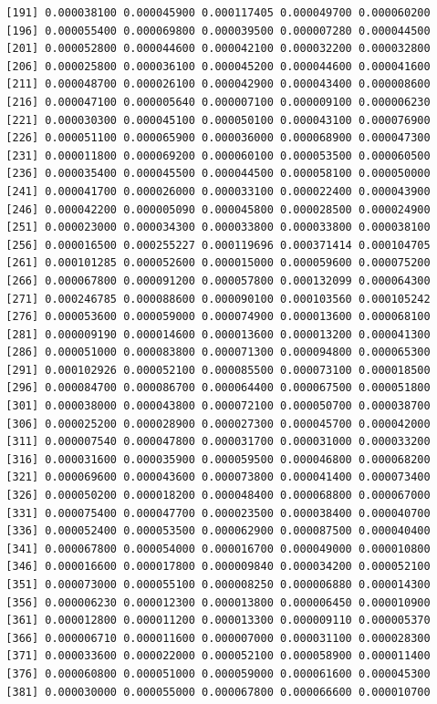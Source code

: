 \documentclass[]{article}
\begin{document}
\begin{verbatim}
  [191] 0.000038100 0.000045900 0.000117405 0.000049700 0.000060200
  [196] 0.000055400 0.000069800 0.000039500 0.000007280 0.000044500
  [201] 0.000052800 0.000044600 0.000042100 0.000032200 0.000032800
  [206] 0.000025800 0.000036100 0.000045200 0.000044600 0.000041600
  [211] 0.000048700 0.000026100 0.000042900 0.000043400 0.000008600
  [216] 0.000047100 0.000005640 0.000007100 0.000009100 0.000006230
  [221] 0.000030300 0.000045100 0.000050100 0.000043100 0.000076900
  [226] 0.000051100 0.000065900 0.000036000 0.000068900 0.000047300
  [231] 0.000011800 0.000069200 0.000060100 0.000053500 0.000060500
  [236] 0.000035400 0.000045500 0.000044500 0.000058100 0.000050000
  [241] 0.000041700 0.000026000 0.000033100 0.000022400 0.000043900
  [246] 0.000042200 0.000005090 0.000045800 0.000028500 0.000024900
  [251] 0.000023000 0.000034300 0.000033800 0.000033800 0.000038100
  [256] 0.000016500 0.000255227 0.000119696 0.000371414 0.000104705
  [261] 0.000101285 0.000052600 0.000015000 0.000059600 0.000075200
  [266] 0.000067800 0.000091200 0.000057800 0.000132099 0.000064300
  [271] 0.000246785 0.000088600 0.000090100 0.000103560 0.000105242
  [276] 0.000053600 0.000059000 0.000074900 0.000013600 0.000068100
  [281] 0.000009190 0.000014600 0.000013600 0.000013200 0.000041300
  [286] 0.000051000 0.000083800 0.000071300 0.000094800 0.000065300
  [291] 0.000102926 0.000052100 0.000085500 0.000073100 0.000018500
  [296] 0.000084700 0.000086700 0.000064400 0.000067500 0.000051800
  [301] 0.000038000 0.000043800 0.000072100 0.000050700 0.000038700
  [306] 0.000025200 0.000028900 0.000027300 0.000045700 0.000042000
  [311] 0.000007540 0.000047800 0.000031700 0.000031000 0.000033200
  [316] 0.000031600 0.000035900 0.000059500 0.000046800 0.000068200
  [321] 0.000069600 0.000043600 0.000073800 0.000041400 0.000073400
  [326] 0.000050200 0.000018200 0.000048400 0.000068800 0.000067000
  [331] 0.000075400 0.000047700 0.000023500 0.000038400 0.000040700
  [336] 0.000052400 0.000053500 0.000062900 0.000087500 0.000040400
  [341] 0.000067800 0.000054000 0.000016700 0.000049000 0.000010800
  [346] 0.000016600 0.000017800 0.000009840 0.000034200 0.000052100
  [351] 0.000073000 0.000055100 0.000008250 0.000006880 0.000014300
  [356] 0.000006230 0.000012300 0.000013800 0.000006450 0.000010900
  [361] 0.000012800 0.000011200 0.000013300 0.000009110 0.000005370
  [366] 0.000006710 0.000011600 0.000007000 0.000031100 0.000028300
  [371] 0.000033600 0.000022000 0.000052100 0.000058900 0.000011400
  [376] 0.000060800 0.000051000 0.000059000 0.000061600 0.000045300
  [381] 0.000030000 0.000055000 0.000067800 0.000066600 0.000010700

\end{verbatim}
\end{document}
